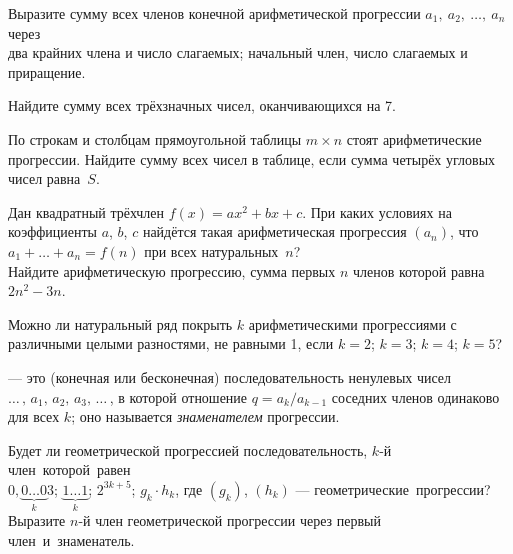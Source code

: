\documentclass[a4paper,12pt]{article}
\begin{document}
Выразите сумму всех членов конечной арифметической
прогрессии $a_1,\ \!a_2,\ \!\ldots,\ \!a_n$
через\\
 два крайних члена и число слагаемых;
 начальный член, число слагаемых и приращение.

Найдите сумму всех тр\"ехзначных чисел, оканчивающихся на 7.


По строкам и столбцам прямоугольной таблицы %
$m\times n$ стоят
арифметические прогрессии. Найдите сумму всех чисел в таблице,
если сумма четыр\"ех угловых чисел равна~$S$.


Дан квадратный тр\"ехчлен $f(x)=ax^2+bx+c$.
При каких условиях на коэффициенты $a$, $b$, $c$
найд\"ется такая арифметическая прогрессия
$(a_n)$, что $a_1+\ldots+a_n=f(n)$ при всех натуральных~$n$?\\
 Найдите арифметическую прогрессию,
сумма первых $n$ членов которой равна $2n^2-3n$.


Можно ли натуральный ряд покрыть $k$ арифметическими
прогрессиями с различными целыми разностями, не равными 1,
если
 $k=2$;
 $k=3$;
 $k=4$;
 $k=5$?




\vspace*{-3pt}

\vspace*{-8pt}

  --- это (конечная или бесконечная)
последовательность ненулевых чисел $\ldots\,,\,a_1,\,a_2,\,a_3,\,\ldots\,$,
в которой отношение $q=a_k/a_{k-1}$ соседних членов
одинаково для всех $k$; оно называется {\it знаменателем\/} прогрессии.


Будет ли геометрической прогрессией последовательность, $k$-й
член~\hbox{которой}~ра\-вен\\
$0,\underbrace{0\ldots0}_{k}3$;
 $\underbrace{1\ldots1}_{k}$;
 $2^{3k+5}$;
 $g_k\cdot h_k$, где $(g_k)$, $(h_k)$ --- геометрические~\hbox{прогрессии?}\\
Выразите $n$-й член геометрической прогрессии через
первый член~и~\hbox{знаменатель.}
\end{document}
